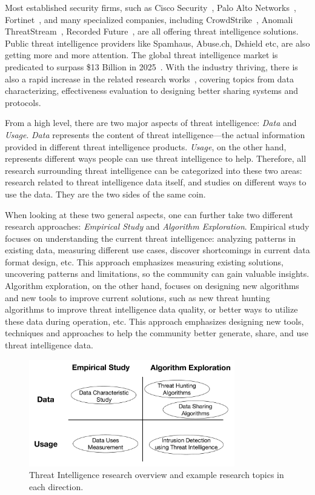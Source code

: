 Most established security firms, such as Cisco Security~\cite{ciscotalos}, 
Palo Alto Networks~\cite{panautofocus}, Fortinet~\cite{fortinet}, 
and many specialized companies, including CrowdStrike~\cite{crowdstrike}, 
Anomali ThreatStream~\cite{anomali}, Recorded Future~\cite{recordedfuture}, 
are all offering threat intelligence solutions. Public threat
intelligence providers like Spamhaus, Abuse.ch, Dshield etc, are also 
getting more and more attention. The global threat intelligence market is
predicated to surpass \$13 Billion in 2025~\cite{tipredict2018}. With the
industry thriving, there is also a rapid increase in the related research
works~\cite{tounsi2018survey}, covering topics from data characterizing,
effectiveness evaluation to designing better sharing systems and protocols.

From a high level, there are two major aspects of threat intelligence: 
\textit{Data} and \textit{Usage}. \textit{Data} represents the content 
of threat intelligence---the actual information provided in different threat
intelligence products. \textit{Usage}, on the other hand, represents 
different ways people can use threat intelligence to help. Therefore, 
all research surrounding threat intelligence can be categorized into 
these two areas: research related to threat intelligence data itself, 
and studies on different ways to use the data. They are the two sides 
of the same coin.

When looking at these two general aspects, one can further 
take two different research approaches: \textit{Empirical Study} and 
\textit{Algorithm Exploration}. Empirical study focuses on 
understanding the current threat intelligence: analyzing patterns 
in existing data, measuring different use cases, discover shortcomings 
in current data format design, etc. This approach emphasizes measuring 
existing solutions, uncovering patterns and limitations, so the 
community can gain valuable insights. Algorithm exploration, 
on the other hand, focuses on designing new algorithms and new tools to 
improve current solutions, such as new threat hunting algorithms to improve 
threat intelligence data quality, or better ways to utilize these data 
during operation, etc. This approach emphasizes designing new tools,
techniques and approaches to help the community better generate, share, 
and use threat intelligence data.

\begin{figure}
\centering
\includegraphics[width=0.8\textwidth]{threat_intel_overview_v2.pdf}
\caption{Threat Intelligence research overview and example research
topics in each direction.}
\label{fig:threat_intel_overview}
\end{figure}

